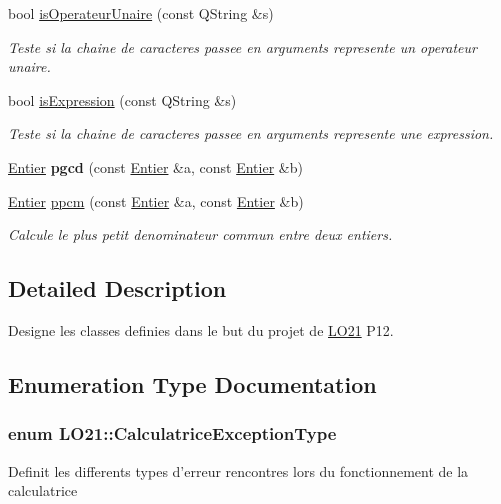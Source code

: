 \begin{DoxyCompactItemize}
bool \hyperlink{namespace_l_o21_a2176f80360e8182e5254c23bbfe01663}{is\-Operateur\-Unaire} (const \-Q\-String \&s)
\begin{DoxyCompactList}\small\item\em \-Teste si la chaine de caracteres passee en arguments represente un operateur unaire. \end{DoxyCompactList}\item 
bool \hyperlink{namespace_l_o21_a53be252c9a79dba5f7a3eca32e899cef}{is\-Expression} (const \-Q\-String \&s)
\begin{DoxyCompactList}\small\item\em \-Teste si la chaine de caracteres passee en arguments represente une expression. \end{DoxyCompactList}\item 
\hypertarget{namespace_l_o21_afe4fa96d8c033dcec80df74c30584090}{\hyperlink{class_l_o21_1_1_entier}{\-Entier} {\bfseries pgcd} (const \hyperlink{class_l_o21_1_1_entier}{\-Entier} \&a, const \hyperlink{class_l_o21_1_1_entier}{\-Entier} \&b)}\label{namespace_l_o21_afe4fa96d8c033dcec80df74c30584090}

\item 
\hyperlink{class_l_o21_1_1_entier}{\-Entier} \hyperlink{namespace_l_o21_aa0da722c9be6b4dce7de9fcb7ade4db7}{ppcm} (const \hyperlink{class_l_o21_1_1_entier}{\-Entier} \&a, const \hyperlink{class_l_o21_1_1_entier}{\-Entier} \&b)
\begin{DoxyCompactList}\small\item\em \-Calcule le plus petit denominateur commun entre deux entiers. \end{DoxyCompactList}\end{DoxyCompactItemize}


\subsection{\-Detailed \-Description}
\-Designe les classes definies dans le but du projet de \hyperlink{namespace_l_o21}{\-L\-O21} \-P12. 

\subsection{\-Enumeration \-Type \-Documentation}
\hypertarget{namespace_l_o21_a4cea05b79a8da799daea8141505d6f59}{
\subsubsection[{\-Calculatrice\-Exception\-Type}]{\setlength{\rightskip}{0pt plus 5cm}enum {\bf \-L\-O21\-::\-Calculatrice\-Exception\-Type}}}\label{namespace_l_o21_a4cea05b79a8da799daea8141505d6f59}
\-Definit les differents types d'erreur rencontres lors du fonctionnement de la calculatrice 

